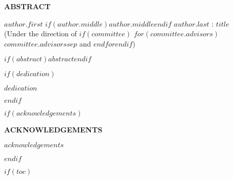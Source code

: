 \documentclass[$if(fontsize)$$fontsize$,$endif$,letterpaper,twoside]{report}
\begin{document}
\begin{center}
\vspace*{52pt}
{\normalsize \textbf{ABSTRACT}}
\vspace{11pt}

\begin{singlespace}
 $author.first$ $if(author.middle)$$author.middle$$endif$ $author.last$ : $title$ \\
(Under the direction of $if(committee)$ $for(committee.advisors)$ $committee.advisors$$sep$ and $endfor$$endif$)
\end{singlespace}
\end{center}

$if(abstract)$$abstract$$endif$

\clearpage


$if(dedication)$
\begin{center}
\vspace*{52pt}

\singlespacing

$dedication$

\end{center}

\pagebreak
$endif$


$if(acknowledgements)$
\begin{center}
\vspace*{52pt}
{\normalsize \textbf{ACKNOWLEDGEMENTS}}
\end{center}

$acknowledgements$

\clearpage
$endif$


$if(toc)$
\renewcommand{\contentsname}{TABLE OF CONTENTS}
\renewcommand{\cfttoctitlefont}{\normalsize\bfseries}
\renewcommand{\cftaftertoctitle}{\hfill}
\renewcommand{\cftdotsep}{1.5}
\cftsetrmarg{1.0in}
\end{document}
